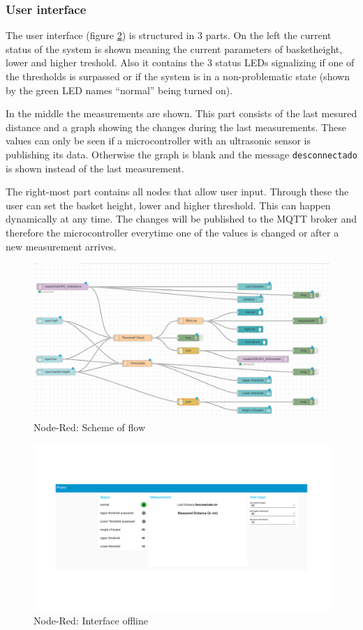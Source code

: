 \documentclass{article}
\begin{document}
\subsubsection{User interface}
The user interface (figure \ref{inteface_offline}) is structured in 3 parts. On
the left the current status of the system is shown meaning the current
parameters of basketheight, lower and higher treshold. Also it contains the 3
status LEDs signalizing if one of the thresholds is surpassed or if the system
is in a non-problematic state (shown by the green LED names \enquote{normal}
being turned on).\par
In the middle the measurements are shown. This part consists of the last mesured
distance and a graph showing the changes during the last measurements. These
values can only be seen if a microcontroller with an ultrasonic sensor is
publishing its data. Otherwise the graph is blank and the message
\verb|desconnectado| is shown instead of the last measurement.\par
The right-most part contains all nodes that allow user input. Through these the
user can set the basket height, lower and higher threshold. This can happen
dynamically at any time. The changes will be published to the MQTT broker and
therefore the microcontroller everytime one of the values is changed or after a
new measurement arrives.
\begin{figure}
	\centering \includegraphics[scale=1.2]{images/flowScheme.png}
	\caption{Node-Red: Scheme of flow}
	\label{flowScheme}
\end{figure}

\begin{figure}
	\centering \includegraphics[scale=0.25]{images/interface_offline_2.png}
	\caption{Node-Red: Interface offline}
	\label{inteface_offline}
\end{figure}
\end{document}
